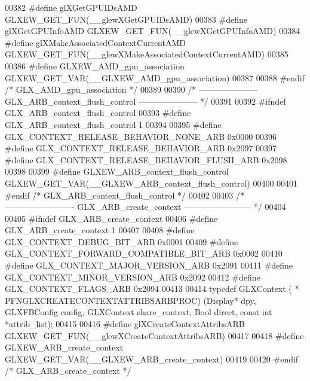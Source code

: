 \begin{DoxyCode}
00382 \textcolor{preprocessor}{#define glXGetGPUIDsAMD GLXEW\_GET\_FUN(\_\_glewXGetGPUIDsAMD)}
00383 \textcolor{preprocessor}{#define glXGetGPUInfoAMD GLXEW\_GET\_FUN(\_\_glewXGetGPUInfoAMD)}
00384 \textcolor{preprocessor}{#define glXMakeAssociatedContextCurrentAMD GLXEW\_GET\_FUN(\_\_glewXMakeAssociatedContextCurrentAMD)}
00385 
00386 \textcolor{preprocessor}{#define GLXEW\_AMD\_gpu\_association GLXEW\_GET\_VAR(\_\_GLXEW\_AMD\_gpu\_association)}
00387 
00388 \textcolor{preprocessor}{#endif }\textcolor{comment}{/* GLX\_AMD\_gpu\_association */}\textcolor{preprocessor}{}
00389 
00390 \textcolor{comment}{/* --------------------- GLX\_ARB\_context\_flush\_control --------------------- */}
00391 
00392 \textcolor{preprocessor}{#ifndef GLX\_ARB\_context\_flush\_control}
00393 \textcolor{preprocessor}{#define GLX\_ARB\_context\_flush\_control 1}
00394 
00395 \textcolor{preprocessor}{#define GLX\_CONTEXT\_RELEASE\_BEHAVIOR\_NONE\_ARB 0x0000}
00396 \textcolor{preprocessor}{#define GLX\_CONTEXT\_RELEASE\_BEHAVIOR\_ARB 0x2097}
00397 \textcolor{preprocessor}{#define GLX\_CONTEXT\_RELEASE\_BEHAVIOR\_FLUSH\_ARB 0x2098}
00398 
00399 \textcolor{preprocessor}{#define GLXEW\_ARB\_context\_flush\_control GLXEW\_GET\_VAR(\_\_GLXEW\_ARB\_context\_flush\_control)}
00400 
00401 \textcolor{preprocessor}{#endif }\textcolor{comment}{/* GLX\_ARB\_context\_flush\_control */}\textcolor{preprocessor}{}
00402 
00403 \textcolor{comment}{/* ------------------------- GLX\_ARB\_create\_context ------------------------ */}
00404 
00405 \textcolor{preprocessor}{#ifndef GLX\_ARB\_create\_context}
00406 \textcolor{preprocessor}{#define GLX\_ARB\_create\_context 1}
00407 
00408 \textcolor{preprocessor}{#define GLX\_CONTEXT\_DEBUG\_BIT\_ARB 0x0001}
00409 \textcolor{preprocessor}{#define GLX\_CONTEXT\_FORWARD\_COMPATIBLE\_BIT\_ARB 0x0002}
00410 \textcolor{preprocessor}{#define GLX\_CONTEXT\_MAJOR\_VERSION\_ARB 0x2091}
00411 \textcolor{preprocessor}{#define GLX\_CONTEXT\_MINOR\_VERSION\_ARB 0x2092}
00412 \textcolor{preprocessor}{#define GLX\_CONTEXT\_FLAGS\_ARB 0x2094}
00413 
00414 \textcolor{keyword}{typedef} GLXContext ( * PFNGLXCREATECONTEXTATTRIBSARBPROC) (Display* dpy, GLXFBConfig config, GLXContext 
      share\_context, Bool direct, \textcolor{keyword}{const} \textcolor{keywordtype}{int} *attrib\_list);
00415 
00416 \textcolor{preprocessor}{#define glXCreateContextAttribsARB GLXEW\_GET\_FUN(\_\_glewXCreateContextAttribsARB)}
00417 
00418 \textcolor{preprocessor}{#define GLXEW\_ARB\_create\_context GLXEW\_GET\_VAR(\_\_GLXEW\_ARB\_create\_context)}
00419 
00420 \textcolor{preprocessor}{#endif }\textcolor{comment}{/* GLX\_ARB\_create\_context */}\textcolor{preprocessor}{}

\end{DoxyCode}
